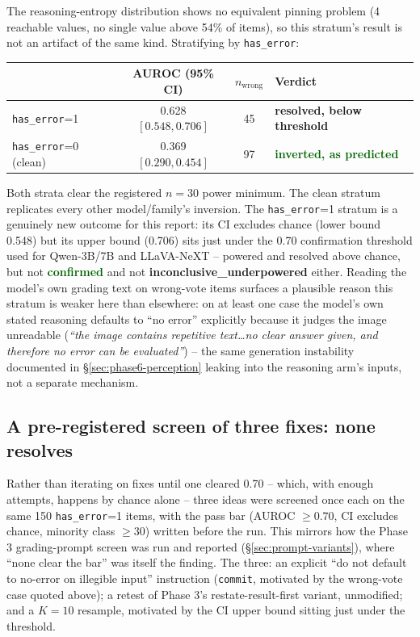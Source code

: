 \documentclass[11pt]{article}
\newcommand{\worked}[1]{\textcolor{darkgreen}{\textbf{#1}}}
\newcommand{\unresolved}[1]{\textcolor{darkamber}{\textbf{#1}}}
\begin{document}
The reasoning-entropy distribution shows no equivalent pinning problem (4
reachable values, no single value above 54\% of items), so this stratum's
result is not an artifact of the same kind. Stratifying by
\texttt{has\_error}:

\begin{center}
\begin{tabular}{lccl}
\toprule
& AUROC (95\% CI) & $n_{\text{wrong}}$ & Verdict \\
\midrule
\texttt{has\_error}=1 & 0.628 $[0.548, 0.706]$ & 45 & \unresolved{resolved, below threshold} \\
\texttt{has\_error}=0 (clean) & 0.369 $[0.290, 0.454]$ & 97 & \worked{inverted, as predicted} \\
\bottomrule
\end{tabular}
\end{center}

Both strata clear the registered $n=30$ power minimum. The clean stratum
replicates every other model/family's inversion. The \texttt{has\_error}=1
stratum is a genuinely new outcome for this report: its CI excludes chance
(lower bound 0.548) but its upper bound (0.706) sits just under the 0.70
confirmation threshold used for Qwen-3B/7B and LLaVA-NeXT -- powered and
resolved above chance, but not \worked{confirmed} and not
\unresolved{inconclusive\_underpowered} either. Reading the model's own
grading text on wrong-vote items surfaces a plausible reason this stratum
is weaker here than elsewhere: on at least one case the model's own stated
reasoning defaults to ``no error'' explicitly because it judges the image
unreadable (\emph{``the image contains repetitive text\ldots no clear
answer given, and therefore no error can be evaluated''}) -- the same
generation instability documented in \S\ref{sec:phase6-perception} leaking
into the reasoning arm's inputs, not a separate mechanism.

\subsection{A pre-registered screen of three fixes: none resolves}
\label{sec:phase6-screen}

Rather than iterating on fixes until one cleared 0.70 -- which, with
enough attempts, happens by chance alone -- three ideas were screened
once each on the same 150 \texttt{has\_error}=1 items, with the pass bar
(AUROC $\geq 0.70$, CI excludes chance, minority class $\geq 30$) written
before the run. This mirrors how the Phase 3 grading-prompt screen was
run and reported (\S\ref{sec:prompt-variants}), where ``none clear the
bar'' was itself the finding. The three: an explicit ``do not default to
no-error on illegible input'' instruction (\texttt{commit}, motivated by
the wrong-vote case quoted above); a retest of Phase 3's
restate-result-first variant, unmodified; and a $K=10$ resample, motivated
by the CI upper bound sitting just under the threshold.
\end{document}
